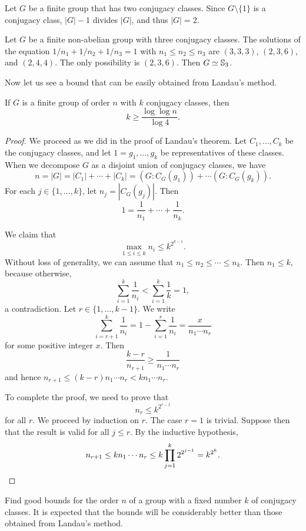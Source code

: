 \begin{example}
  Let $G$ be a finite group that has two conjugacy classes. Since $G\setminus\{1\}$ is a conjugacy class, $|G|-1$ divides $|G|$, and thus $|G|=2$.
\end{example}

\begin{example}
  Let $G$ be a finite non-abelian group with three conjugacy classes. The solutions of the equation $1/n_1+1/n_2+1/n_3=1$ with $n_1\leq n_2\leq n_3$ are $(3,3,3)$, $(2,3,6)$, and $(2,4,4)$. The only possibility is $(2,3,6)$. Then $G\simeq\mathbb{S}_3$.
\end{example}

Now let us see a bound that can be easily obtained from Landau's method.

\begin{theorem}[Neumann]
If $G$ is a finite group of order $n$ with $k$ conjugacy classes, then
\[
k\geq\frac{\log\log n}{\log 4}.
\]
\end{theorem}

\begin{proof}
We proceed as we did in the proof of Landau's theorem. Let $C_1,\dots,C_k$ be the conjugacy classes, and let $1=g_1,\dots,g_k$ be representatives of these classes. When we decompose $G$ as a disjoint union of conjugacy classes, we have 
\[
n=|G|=|C_1|+\cdots+|C_k|=(G:C_G(g_1))+\cdots(G:C_G(g_k)).
\]
For each $j \in \{1,\dots,k\}$, let $n_j=|C_G(g_j)|$. Then 
\[
	1=\frac{1}{n_1}+\cdots+\frac{1}{n_k}.
\]

We claim that 
\[
\max_{1\leq i\leq k}n_i\leq k^{2^{k-1}}.
\]
Without loss of generality, we can assume that $n_1\leq n_2\leq\cdots\leq n_k$. Then $n_1\leq k$, because otherwise, 
\[
\sum_{i=1}^k\frac{1}{n_i}<\sum_{i=1}^k\frac{1}{k}=1,
\]
a contradiction. Let $r\in\{1,\dots,k-1\}$. We write
\[
\sum_{i=r+1}^k\frac{1}{n_i}=1-\sum_{i=1}^r\frac{1}{n_i}=\frac{x}{n_1\cdots n_r}
\]
for some positive integer $x$. Then
\[
\frac{k-r}{n_{r+1}}\geq\frac{1}{n_1\cdots n_r}
\]
and hence $n_{r+1}\leq (k-r)n_1\cdots n_r<kn_1\cdots n_r$.

To complete the proof, we need to prove that 
\begin{equation}
    \label{eq:Neumann}
    n_r\leq k^{2^{r-1}}
\end{equation}
for all $r$. We proceed by induction on $r$. The case $r=1$ is trivial. Suppose then that the result is valid
for all $j\leq r$. By the inductive hypothesis, 
\[
n_{r+1}\leq kn_1\cdots n_r\leq k\prod_{j=1}^k2^{2^{j-1}}=k^{2^k}.\qedhere
\]
\end{proof}


\begin{problem}[Brauer]
Find good bounds for the order $n$ of a group with a fixed number $k$ of conjugacy classes. It is expected that the bounds will be considerably better than those obtained from Landau's method.
\end{problem}
